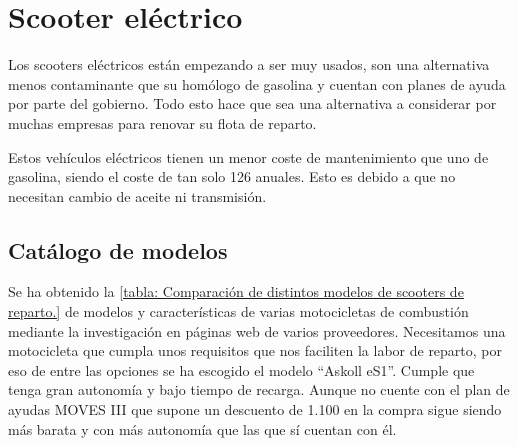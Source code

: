 \newpage
\section{Scooter eléctrico}
\label{anexo_scooter_electrico}
Los scooters eléctricos están empezando a ser muy usados, son una alternativa menos contaminante que su homólogo de gasolina y cuentan con planes de ayuda por parte del gobierno. Todo esto hace que sea una alternativa a considerar por muchas empresas para renovar su flota de reparto.

Estos vehículos eléctricos tienen un menor coste de mantenimiento que uno de gasolina, siendo el coste de tan solo 126  anuales. Esto es debido a que no necesitan cambio de aceite ni transmisión.

\subsection{Catálogo de modelos}

Se ha obtenido la \autoref{tabla: Comparación de distintos modelos de scooters de reparto.} de modelos y características de varias motocicletas de combustión mediante la investigación en páginas web de varios proveedores. Necesitamos una motocicleta que cumpla unos requisitos que nos faciliten la labor de reparto, por eso de entre las opciones se ha escogido el modelo “Askoll eS1”. Cumple que tenga gran autonomía y bajo tiempo de recarga. Aunque no cuente con el plan de ayudas MOVES III que supone un descuento de 1.100  en la compra sigue siendo más barata y con más autonomía que las que sí cuentan con él.

\begin{table}[H]
\centering
{}
\caption{Comparación de distintos modelos de scooters de reparto.}
\label{tabla: Comparación de distintos modelos de scooters de reparto.}
\end{table}
